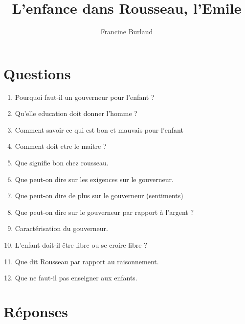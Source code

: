 \documentclass[a4paper, 11pt, hidelinks]{article}
\begin{document}
\title{L'enfance dans Rousseau, l'Emile}
\author{Francine Burlaud}

\maketitle

\tableofcontents


\newpage




\section{Questions}



\begin{enumerate}
    \item Pourquoi faut-il un gouverneur pour l'enfant ?
    \item Qu'elle education doit donner l'homme ?
    \item Comment savoir ce qui est bon et mauvais pour l'enfant
    \item Comment doit etre le maitre ?
    \item Que signifie bon chez rousseau.
    \item Que peut-on dire sur les exigences sur le gouverneur.
    \item Que peut-on dire de plus sur le gouverneur (sentiments)
    \item Que peut-on dire sur le gouverneur par rapport à l'argent ?
    \item Caractérisation du gouverneur.
    \item L'enfant doit-il être libre ou se croire libre ?
    \item Que dit Rousseau par rapport au raisonnement.
    \item Que ne faut-il pas enseigner aux enfants.
\end{enumerate}


\section{Réponses}
\end{document}
